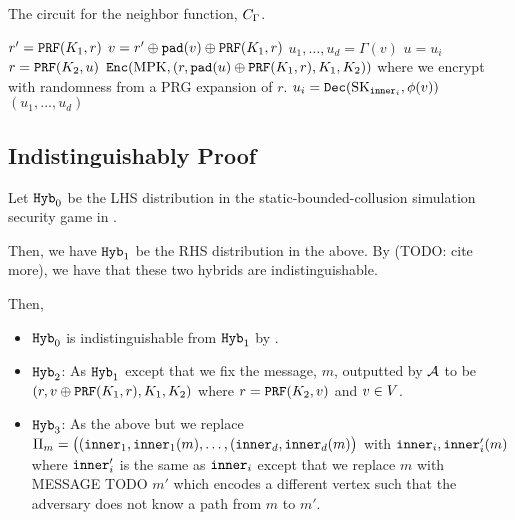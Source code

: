 \begin{algorithm}[H]
	\caption{
		The circuit for the neighbor function, $C_\Gamma$.
	}
	\begin{algorithmic}[1]
			\State $r' = \texttt{PRF}(K_1, r)$
			\State $v = r' \oplus \texttt{pad}(v) \oplus \texttt{PRF}(K_1, r)$
			\State $u_1, \dots, u_d = \Gamma(v)$
			\State $u = u_i$
			\State $r = \texttt{PRF}(K_2, u)$
			\State \Return $\texttt{Enc}(\text{MPK}, (r, \texttt{pad}(u) \oplus \texttt{PRF}(K_1, r), K_1, K_2))$ where we encrypt with randomness from a PRG expansion of $r$.
		\EndFunction
				\State $u_i = \texttt{Dec}(\text{SK}_{\texttt{inner}_i}, \phi(v))$
			\EndFor
			\State \Return $(u_1, \dots, u_d)$
		\EndFunction
	\end{algorithmic}
\end{algorithm}

\subsection{Indistinguishably Proof}
Let $\texttt{Hyb}_0$ be the LHS distribution in the static-bounded-collusion simulation security game in \cite{garg2022dynamic}.

Then, we have $\texttt{Hyb}_1$ be the RHS distribution in the above. By \cite{garg2022dynamic} (TODO: cite more), we have that
these two hybrids are indistinguishable.

Then,
\begin{itemize}
	\item $\texttt{Hyb}_0$ is indistinguishable from $\texttt{Hyb}_1$ by \cite{garg2022dynamic}.
	\item $\texttt{Hyb}_2$: As $\texttt{Hyb}_1$ except that we fix the message, $m$, outputted by $\mathcal{A}$ to be %
		$(r, v \oplus \texttt{PRF}(K_1, r), K_1, K_2)$ where $r = \texttt{PRF}(K_2, v)$ and $v \in V$.
	\item $\texttt{Hyb}_3$: As the above but we replace $\Pi_m = \big((\texttt{inner}_1, \texttt{inner}_1(m), \dots, (\texttt{inner}_d, \texttt{inner}_d(m)\big)$
	with $\texttt{inner}_i, \texttt{inner}'_i(m)$ where $\texttt{inner}'_i$ is the same as $\texttt{inner}_i$ except that we replace $m$ with MESSAGE TODO $m'$ which encodes a different vertex such that the adversary does not know a path from $m$ to $m'$.


\end{itemize}

